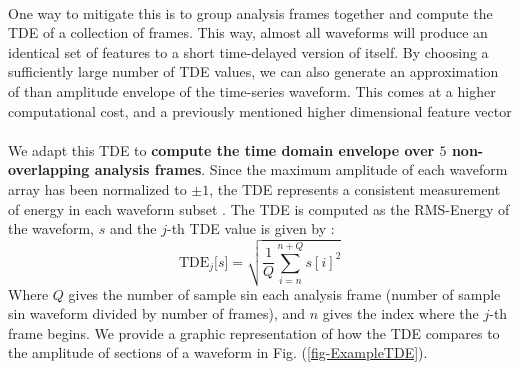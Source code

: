 \documentclass[12pt,letterpaper]{article}
\begin{document}
\paragraph*{}One way to mitigate this is to group analysis frames together and compute the TDE of a collection of frames. This way,  almost all waveforms will produce an identical set of features to a short time-delayed version of itself. By choosing a sufficiently large number of TDE values, we can also generate an approximation of than amplitude envelope of the time-series waveform. This comes at a higher computational cost, and a previously mentioned higher dimensional feature vector

\paragraph*{}We adapt this TDE to \textbf{compute the time domain envelope over $5$ non-overlapping analysis frames}. Since the maximum amplitude of each waveform array has been normalized to $\pm 1$, the TDE represents a consistent measurement of energy in each waveform subset \cite{Liu}. The TDE is computed as the RMS-Energy of the waveform, $s$ and the $j$-th TDE value is given by \cite{Olson,Serizel}:
\begin{equation}
\label{eqn-RMS}
\text{TDE}_j\big[ s \big] = \sqrt{\frac{1}{Q} \sum_{i=n}^{n+Q} s[i]^2}
\end{equation}
Where $Q$ gives the number of sample sin each analysis frame (number of sample sin waveform divided by number of frames), and $n$ gives the index where the $j$-th frame begins. We provide a graphic representation of how the TDE compares to the amplitude of sections of a waveform in Fig. (\ref{fig-ExampleTDE}).
\end{document}
